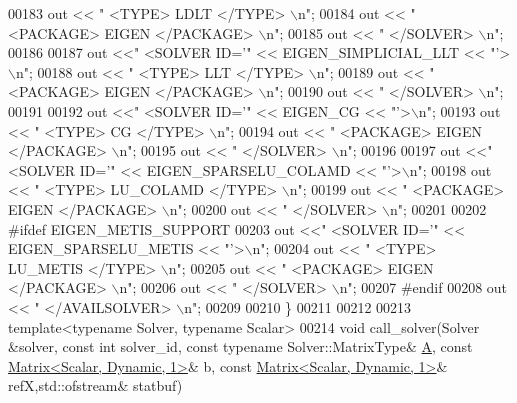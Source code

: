 \begin{DoxyCode}
00183   out << \textcolor{stringliteral}{"   <TYPE> LDLT </TYPE> \(\backslash\)n"};
00184   out << \textcolor{stringliteral}{"   <PACKAGE> EIGEN </PACKAGE> \(\backslash\)n"}; 
00185   out << \textcolor{stringliteral}{"  </SOLVER> \(\backslash\)n"}; 
00186   
00187   out <<\textcolor{stringliteral}{"  <SOLVER ID='"} << EIGEN\_SIMPLICIAL\_LLT << \textcolor{stringliteral}{"'>\(\backslash\)n"}; 
00188   out << \textcolor{stringliteral}{"   <TYPE> LLT </TYPE> \(\backslash\)n"};
00189   out << \textcolor{stringliteral}{"   <PACKAGE> EIGEN </PACKAGE> \(\backslash\)n"}; 
00190   out << \textcolor{stringliteral}{"  </SOLVER> \(\backslash\)n"}; 
00191   
00192   out <<\textcolor{stringliteral}{"  <SOLVER ID='"} << EIGEN\_CG << \textcolor{stringliteral}{"'>\(\backslash\)n"}; 
00193   out << \textcolor{stringliteral}{"   <TYPE> CG </TYPE> \(\backslash\)n"};
00194   out << \textcolor{stringliteral}{"   <PACKAGE> EIGEN </PACKAGE> \(\backslash\)n"}; 
00195   out << \textcolor{stringliteral}{"  </SOLVER> \(\backslash\)n"}; 
00196   
00197   out <<\textcolor{stringliteral}{"  <SOLVER ID='"} << EIGEN\_SPARSELU\_COLAMD << \textcolor{stringliteral}{"'>\(\backslash\)n"}; 
00198   out << \textcolor{stringliteral}{"   <TYPE> LU\_COLAMD </TYPE> \(\backslash\)n"};
00199   out << \textcolor{stringliteral}{"   <PACKAGE> EIGEN </PACKAGE> \(\backslash\)n"}; 
00200   out << \textcolor{stringliteral}{"  </SOLVER> \(\backslash\)n"}; 
00201   
00202 \textcolor{preprocessor}{#ifdef EIGEN\_METIS\_SUPPORT}
00203   out <<\textcolor{stringliteral}{"  <SOLVER ID='"} << EIGEN\_SPARSELU\_METIS << \textcolor{stringliteral}{"'>\(\backslash\)n"}; 
00204   out << \textcolor{stringliteral}{"   <TYPE> LU\_METIS </TYPE> \(\backslash\)n"};
00205   out << \textcolor{stringliteral}{"   <PACKAGE> EIGEN </PACKAGE> \(\backslash\)n"}; 
00206   out << \textcolor{stringliteral}{"  </SOLVER> \(\backslash\)n"}; 
00207 \textcolor{preprocessor}{#endif}
00208   out << \textcolor{stringliteral}{" </AVAILSOLVER> \(\backslash\)n"}; 
00209   
00210 \}
00211 
00212 
00213 \textcolor{keyword}{template}<\textcolor{keyword}{typename} Solver, \textcolor{keyword}{typename} Scalar>
00214 \textcolor{keywordtype}{void} call\_solver(Solver &solver, \textcolor{keyword}{const} \textcolor{keywordtype}{int} solver\_id, \textcolor{keyword}{const} \textcolor{keyword}{typename} Solver::MatrixType& 
      \hyperlink{group___core___module_class_eigen_1_1_matrix}{A}, \textcolor{keyword}{const} \hyperlink{group___core___module}{Matrix<Scalar, Dynamic, 1>}& b, \textcolor{keyword}{const} 
      \hyperlink{group___core___module}{Matrix<Scalar, Dynamic, 1>}& refX,std::ofstream& statbuf)

\end{DoxyCode}
